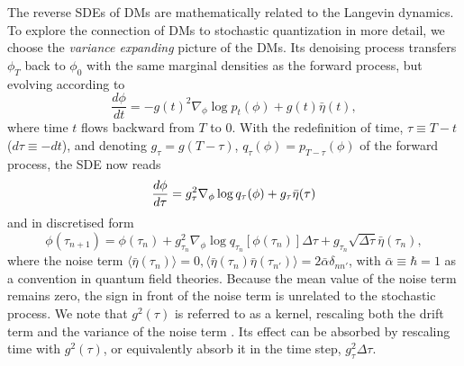 The reverse SDEs of DMs are mathematically related to the Langevin dynamics. To explore the connection of DMs to stochastic quantization in more detail, we choose the \textit{variance expanding} picture of the DMs. Its denoising process transfers $\phi_T$ back to $\phi_0$ with the same marginal densities as the forward process, but evolving according to
\begin{equation}
    \frac{d\phi}{dt} =  - g(t)^2 \nabla_\phi \log{p_t(\phi)} +  g(t) \bar{\eta}(t),
\end{equation}
where time $t$ flows backward from $T$ to 0. With the redefinition of time, $\tau\equiv T-t$ ($d\tau \equiv -dt$), and denoting $g_\tau=g(T-\tau)$, $q_{\tau}(\phi)=p_{T-\tau}(\phi)$ of the forward process, the SDE now reads
\begin{equation}
    \frac{d\phi}{d\tau} = g_\tau^2\nabla_\phi \log{q_{\tau}(\phi)} + g_\tau\bar{\eta}(\tau) \label{eq:dmle}\\ 
\end{equation}
and in discretised form
\begin{equation}    
    \phi(\tau_{n+1}) = \phi(\tau_n) +  g_{\tau_n}^2\nabla_\phi \log{q_{\tau_n}[\phi(\tau_n)]} \Delta\tau +  g_{\tau_n}\sqrt{\Delta\tau}\bar{\eta}(\tau_n),
\end{equation}
where the noise term $\langle\bar{\eta}(\tau_n)\rangle = 0, \langle\bar{\eta}(\tau_n)\bar{\eta}(\tau_{n'})\rangle = 2\bar\alpha\delta_{nn'}$, { with $\bar{\alpha} \equiv \hbar =1$ as a convention in quantum field theories}. Because the mean value of the noise term remains zero, the sign in front of the noise term is unrelated to the stochastic process. 
We note that $g^2(\tau)$ is referred to as a kernel, rescaling both the drift term and the variance of the noise term \cite{Damgaard:1987rr}.
Its effect can be absorbed by rescaling time with $g^2(\tau)$, or equivalently absorb it in the time step, $ g_\tau^2\Delta\tau$.

